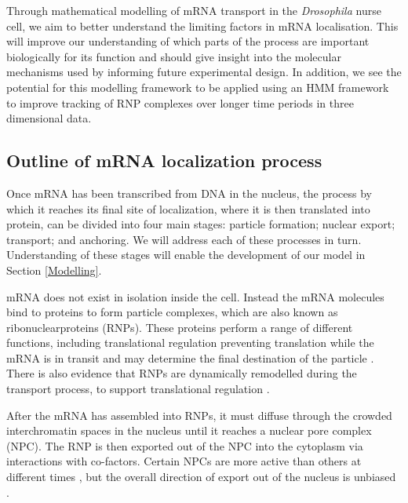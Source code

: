 \documentclass[twocolumn]{biophys}
\begin{document}
Through mathematical modelling of mRNA transport in the \textit{Drosophila} nurse cell, we aim to better understand the limiting factors in mRNA localisation.
This will improve our understanding of which parts of the process are important biologically for its function and should give insight into the molecular mechanisms used by informing future experimental design.
In addition, we see the potential for this modelling framework to be applied using an HMM framework to improve tracking of RNP complexes over longer time periods in three dimensional data.

\subsection{Outline of mRNA localization process} \label{Outline}

Once mRNA has been transcribed from DNA in the nucleus, the process by which it reaches its final site of localization, where it is then translated into protein, can be divided into four main stages: particle formation; nuclear export; transport; and anchoring.
We will address each of these processes in turn.
Understanding of these stages will enable the development of our model in Section \ref{Modelling}.

mRNA does not exist in isolation inside the cell.
Instead the mRNA molecules bind to proteins to form particle complexes, which are also known as ribonuclearproteins (RNPs). 
These proteins perform a range of different functions, including translational regulation preventing translation while the mRNA is in transit and may determine the final destination of the particle \citep{hamilton2013multidisciplinary}.
There is also evidence that RNPs are dynamically remodelled during the transport process, to support translational regulation \citep{weil2012drosophila}.

After the mRNA has assembled into RNPs, it must diffuse through the crowded interchromatin spaces in the nucleus until it reaches a nuclear pore complex (NPC).
The RNP is then exported out of the NPC into the cytoplasm via interactions with co-factors.
Certain NPCs are more active than others at different times \citep{weil2012drosophila}, but the overall direction of export out of the nucleus is unbiased \citep{wilkie2001drosophila}. 
\end{document}
